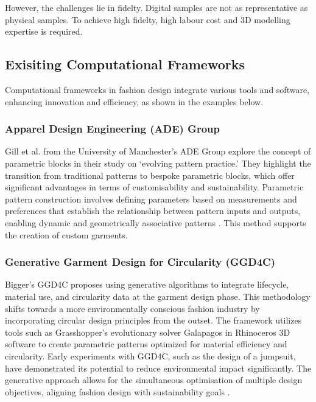 However, the challenges lie in fidelty. Digital samples are not as representative as physical samples. To achieve high fidelty, high labour cost and 3D modelling expertise is required.

\subsection{Exisiting Computational Frameworks}
Computational frameworks in fashion design integrate various tools and software, enhancing innovation and efficiency, as shown in the examples below.

\subsubsection{Apparel Design Engineering (ADE) Group}
Gill et al. from the University of Manchester's ADE Group explore the concept of parametric blocks in their study on `evolving pattern practice.' They highlight the transition from traditional patterns to bespoke parametric blocks, which offer significant advantages in terms of customisability and sustainability. Parametric pattern construction involves defining parameters based on measurements and preferences that establish the relationship between pattern inputs and outputs, enabling dynamic and geometrically associative patterns \cite{gill_evolving_2023}. This method supports the creation of custom garments.

\subsubsection{Generative Garment Design for Circularity (GGD4C)}
Bigger's GGD4C proposes using generative algorithms to integrate lifecycle, material use, and circularity data at the garment design phase. This methodology shifts towards a more environmentally conscious fashion industry by incorporating circular design principles from the outset. The framework utilizes tools such as Grasshopper's evolutionary solver Galapagos in Rhinoceros 3D software to create parametric patterns optimized for material efficiency and circularity. Early experiments with GGD4C, such as the design of a jumpsuit, have demonstrated its potential to reduce environmental impact significantly. The generative approach allows for the simultaneous optimisation of multiple design objectives, aligning fashion design with sustainability goals \cite{bigger_generative_2021}.


